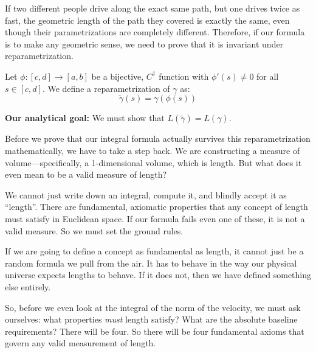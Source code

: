 \begin{spoken-clean}[00:08:30 - 00:09:30]
If two different people drive along the exact same path, but one drives twice as fast, the geometric length of the path they covered is exactly the same, even though their parametrizations are completely different. Therefore, if our formula is to make any geometric sense, we need to prove that it is invariant under reparametrization.
\end{spoken-clean}

\begin{math-stroke}
Let $\phi: [c, d] \to [a, b]$ be a bijective, $C^1$ function with $\phi'(s) \neq 0$ for all $s \in [c, d]$.
We define a reparametrization of $\gamma$ as:
\[
\tilde{\gamma}(s) = \gamma(\phi(s))
\]

\textbf{Our analytical goal:} We must show that $L(\tilde{\gamma}) = L(\gamma)$.
\end{math-stroke}

\begin{spoken-clean}[00:09:30 - 00:10:30]
Before we prove that our integral formula actually survives this reparametrization mathematically, we have to take a step back. We are constructing a measure of volume—specifically, a 1-dimensional volume, which is length. But what does it even mean to be a valid measure of length?
\end{spoken-clean}

\begin{spoken-clean}[00:10:30 - 00:11:30]
We cannot just write down an integral, compute it, and blindly accept it as ``length''. There are fundamental, axiomatic properties that any concept of length must satisfy in Euclidean space. If our formula fails even one of these, it is not a valid measure. So we must set the ground rules.
\end{spoken-clean}


\begin{spoken-clean}[00:11:30 - 00:12:30]
If we are going to define a concept as fundamental as length, it cannot just be a random formula we pull from the air. It has to behave in the way our physical universe expects lengths to behave. If it does not, then we have defined something else entirely. 

So, before we even look at the integral of the norm of the velocity, we must ask ourselves: what properties \textit{must} length satisfy? What are the absolute baseline requirements? There will be four. So there will be four fundamental axioms that govern any valid measurement of length.
\end{spoken-clean}

